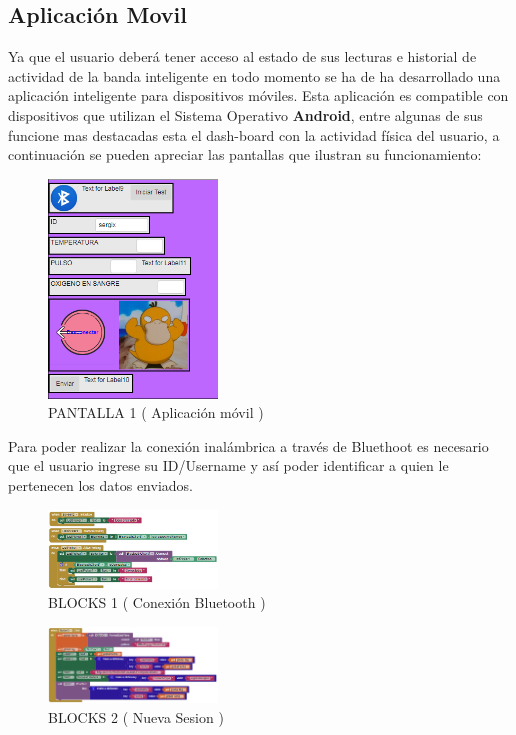 \documentclass[osajnl,twocolumn,showpacs,superscriptaddress,10pt]{revtex4-1}
\begin{document}
\subsection{Aplicación Movil}
    Ya que el usuario deberá tener acceso al estado de sus lecturas e historial de actividad de la banda inteligente en todo momento se ha de ha desarrollado una aplicación inteligente para dispositivos móviles. Esta aplicación es compatible con dispositivos que utilizan el Sistema Operativo \textbf{Android}, entre algunas de sus funcione mas destacadas esta el dash-board con la actividad física del usuario, a continuación se pueden apreciar las pantallas que ilustran su funcionamiento:
    
\begin{figure} [H] \centering 
\caption{PANTALLA 1 ( Aplicación móvil )}
\includegraphics[width=0.4\textwidth]{PantallaPrincipal.png} 
\end{figure}

    Para poder realizar la conexión inalámbrica a través de  Bluethoot es necesario que el usuario ingrese su ID/Username y así poder identificar a quien le pertenecen los datos enviados.
    
\begin{figure} [H] \centering 
\caption{BLOCKS 1 ( Conexión Bluetooth )}
\includegraphics[width=0.4\textwidth]{ConexionBT.png} 
\end{figure}

\begin{figure} [H] \centering 
\caption{BLOCKS 2 ( Nueva Sesion )}
\includegraphics[width=0.4\textwidth]{NuevaSesion.PNG} 
\end{figure}
\end{document}

